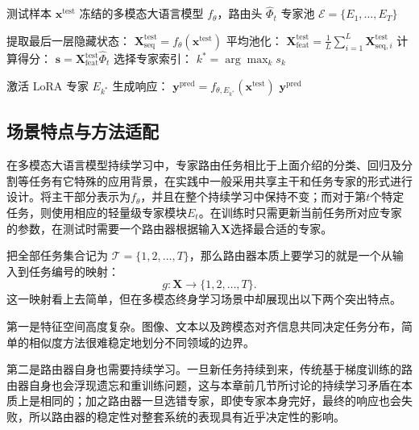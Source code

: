 \begin{algorithm}[t]
\caption{CF-Router 推理过程}
\label{alg:inference}
\begin{algorithmic}[1]
\REQUIRE 测试样本 $\mathbf{x}^{\mathrm{test}}$
\REQUIRE 冻结的多模态大语言模型 $f_\theta$，路由头 $\widehat{\Phi}_t$
\REQUIRE 专家池 $\mathcal{E} = \{E_1, \dots, E_T\}$

\STATE {}
\STATE 提取最后一层隐藏状态： $\mathbf{X}_{\mathrm{seq}}^{\mathrm{test}} = f_\theta(\mathbf{x}^{\mathrm{test}})$
\STATE 平均池化： $\mathbf{X}_{\mathrm{feat}}^{\mathrm{test}} = \frac{1}{L}\sum_{i=1}^{L}\mathbf{X}_{\mathrm{seq},i}^{\mathrm{test}}$
\STATE 计算得分： $\mathbf{s} = \mathbf{X}_{\mathrm{feat}}^{\mathrm{test}} \widehat{\Phi}_t$
\STATE 选择专家索引： $k^* = \arg\max_{k} s_k$

\STATE {}
\STATE 激活 LoRA 专家 $E_{k^*}$
\STATE 生成响应： $\mathbf{y}^{\mathrm{pred}} = f_{\theta, E_{k^*}}(\mathbf{x}^{\mathrm{test}})$
\RETURN $\mathbf{y}^{\mathrm{pred}}$
\end{algorithmic}
\end{algorithm}

\subsection{场景特点与方法适配}

在多模态大语言模型持续学习中，专家路由任务相比于上面介绍的分类、回归及分割等任务有它特殊的应用背景，在实践中一般采用共享主干和任务专家的形式进行设计。将主干部分表示为$f_\theta$，并且在整个持续学习中保持不变；而对于第$t$个特定任务，则使用相应的轻量级专家模块$E_t$。在训练时只需更新当前任务所对应专家的参数，在测试时需要一个路由器根据输入$\mathbf{X}$选择最合适的专家。

把全部任务集合记为 $\mathcal{T}=\{1,2,\ldots,T\}$，那么路由器本质上要学习的就是一个从输入到任务编号的映射：
\begin{equation}
g: \mathbf{X} \rightarrow \{1,2,\ldots,T\}.
\end{equation}
这一映射看上去简单，但在多模态终身学习场景中却展现出以下两个突出特点。

第一是特征空间高度复杂。图像、文本以及跨模态对齐信息共同决定任务分布，简单的相似度方法很难稳定地划分不同领域的边界。

第二是路由器自身也需要持续学习。一旦新任务持续到来，传统基于梯度训练的路由器自身也会浮现遗忘和重训练问题，这与本章前几节所讨论的持续学习矛盾在本质上是相同的；加之路由器一旦选错专家，即使专家本身完好，最终的响应也会失败，所以路由器的稳定性对整套系统的表现具有近乎决定性的影响。

